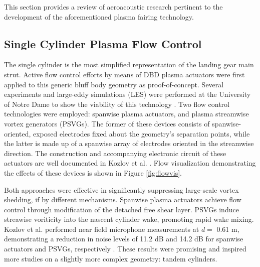 This section provides a review of aeroacoustic research pertinent to the development of the aforementioned plasma fairing technology.

\subsection{Single Cylinder Plasma Flow Control}

The single cylinder is the most simplified representation of the landing gear main strut. Active flow control efforts by means of DBD plasma actuators were first applied to this generic bluff body geometry as proof-of-concept. Several experiments and large-eddy simulations (LES) were performed at the University of Notre Dame to show the viability of this technology \cite{kim2009} \cite{kozlov2011}. Two flow control technologies were employed: spanwise plasma actuators, and plasma streamwise vortex generators (PSVGs). The former of these devices consists of spanwise-oriented, exposed electrodes fixed about the geometry's separation points, while the latter is made up of a spanwise array of electrodes oriented in the streamwise direction. The construction and accompanying electronic circuit of these actuators are well documented in Kozlov et al. \cite{kozlov2011}. Flow visualization demonstrating the effects of these devices is shown in Figure \ref{fig:flowvis}. 

Both approaches were effective in significantly suppressing large-scale vortex shedding, if by different mechanisms. Spanwise plasma actuators achieve flow control through modification of the detached free shear layer. PSVGs induce streawise voriticity into the nascent cylinder wake, promoting rapid wake mixing. Kozlov et al. performed near field microphone measurements at $d=$ 0.61 m, demonstrating a reduction in noise levels of 11.2 dB and 14.2 dB for spanwise actuators and PSVGs, respectively \cite{kozlov2011}. These results were promising and inspired more studies on a slightly more complex geometry: tandem cylinders.

